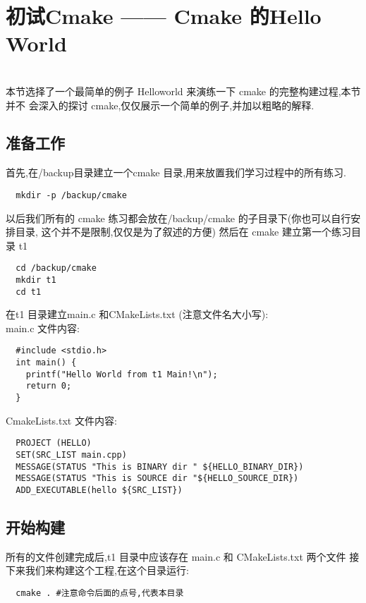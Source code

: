 \documentclass[oneside, 12pt]{book}
\begin{document}
\chapter{初试Cmake —— Cmake 的Hello World}
\\
本节选择了一个最简单的例子 Helloworld 来演练一下 cmake 的完整构建过程,本节并不 会深入的探讨 cmake,仅仅展示一个简单的例子,并加以粗略的解释.
\section{准备工作}
首先,在/backup目录建立一个cmake 目录,用来放置我们学习过程中的所有练习.
\begin{verbatim}
  mkdir -p /backup/cmake
\end{verbatim}
以后我们所有的 cmake 练习都会放在/backup/cmake 的子目录下(你也可以自行安排目录, 这个并不是限制,仅仅是为了叙述的方便)
然后在 cmake 建立第一个练习目录 t1
\begin{verbatim}
  cd /backup/cmake 
  mkdir t1 
  cd t1
\end{verbatim}
\newpage
\noindent 在t1 目录建立main.c 和CMakeLists.txt (注意文件名大小写):\\
main.c 文件内容:
\begin{verbatim}
  #include <stdio.h> 
  int main() {
    printf("Hello World from t1 Main!\n");
    return 0; 
  }
\end{verbatim}
CmakeLists.txt 文件内容:
\begin{verbatim}
  PROJECT (HELLO) 
  SET(SRC_LIST main.cpp) 
  MESSAGE(STATUS "This is BINARY dir " ${HELLO_BINARY_DIR}) 
  MESSAGE(STATUS "This is SOURCE dir "${HELLO_SOURCE_DIR}) 
  ADD_EXECUTABLE(hello ${SRC_LIST})
\end{verbatim}

\section{开始构建}
所有的文件创建完成后,t1 目录中应该存在 main.c 和 CMakeLists.txt 两个文件 接下来我们来构建这个工程,在这个目录运行:
\begin{verbatim}
  cmake . #注意命令后面的点号,代表本目录
\end{verbatim}
\end{document}
